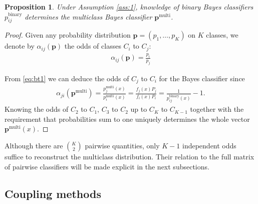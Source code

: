 \documentclass[pdflatex, sn-basic]{sn-jnl}%
\newtheorem{prop}{Proposition}
\theoremstyle{thmstyleone}%
\theoremstyle{thmstyletwo}%
\theoremstyle{thmstylethree}%
\begin{document}
\begin{prop}
	 \label{prop:binary2multi}
	 Under Assumption \ref{ass:1}, knowledge of binary Bayes classifiers $p^\textrm{binary}_{ij}$ determines the multiclass Bayes classifier 
	 $\boldsymbol{p}^\textrm{multi}$.
\end{prop}
\begin{proof}
	Given any probability distribution $\boldsymbol{p} = (p_1, \ldots,p_K)$ on $K$ classes, we denote by $\alpha_{ij}(\boldsymbol{p})$ the odds of classes $C_i$ to $C_j$:
	\begin{align}
		\alpha_{ij}(\boldsymbol{p}) = \frac{p_i}{p_j} \label{eq:alpha}
	\end{align}
	
	From \eqref{eq:bt1} we can deduce the odds of  $C_j$ to $C_i$ for the Bayes classifier since
	\begin{align}
	\alpha_{ji}(\boldsymbol{p}^\textrm{multi}) = \frac{p_j^\textrm{multi}(x)}{p_i^\textrm{multi}(x)}
	=  \frac{f_j(x) P_j}{f_i(x) P_i} = \frac{1}{p^\textrm{binary}_{ij}(x)}- 1.
	\end{align}
	Knowing the odds of $C_2$ to $C_1$, $C_3$ to $C_2$ up to $C_{K}$ to $C_{K-1}$ together with the requirement that probabilities sum to one uniquely determines the whole vector $\boldsymbol{p}^\textrm{multi}(x)$.
\end{proof}

Although there are $\binom{K}{2}$ pairwise quantities, only $K-1$ independent odds suffice to reconstruct the multiclass distribution. Their relation to the full matrix of pairwise classifiers will be made explicit in the next subsections.


\subsection{Coupling methods}
\end{document}
